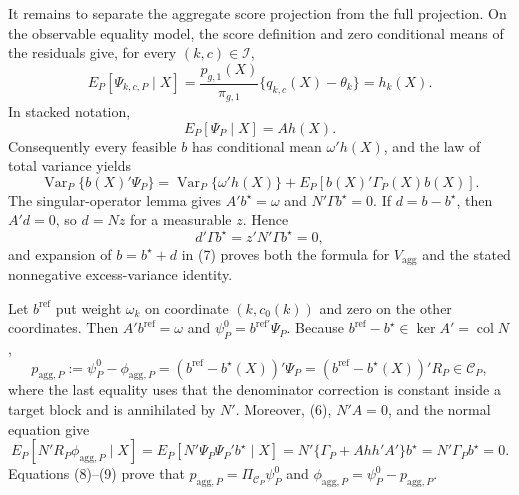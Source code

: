 It remains to separate the aggregate score projection from the full projection.  On the observable equality model, the score definition and zero conditional means of the residuals give, for every \((k,c)\in\mathcal I\),
\[
E_P[\Psi_{k,c,P}\mid X]
=\frac{p_{g,1}(X)}{\pi_{g,1}}\{q_{k,c}(X)-\theta_k\}=h_k(X).
\]
In stacked notation,
\[
E_P[\Psi_P\mid X]=Ah(X).
\tag{6}
\]
Consequently every feasible \(b\) has conditional mean \(\omega'h(X)\), and the law of total variance yields
\[
\operatorname{Var}_P\{b(X)'\Psi_P\}
=\operatorname{Var}_P\{\omega'h(X)\}+E_P[b(X)'\Gamma_P(X)b(X)].
\tag{7}
\]
The singular-operator lemma gives \(A'b^\star=\omega\) and \(N'\Gamma b^\star=0\).  If \(d=b-b^\star\), then \(A'd=0\), so \(d=Nz\) for a measurable \(z\).  Hence
\[
d'\Gamma b^\star=z'N'\Gamma b^\star=0,
\]
and expansion of \(b=b^\star+d\) in (7) proves both the formula for \(V_{\mathrm{agg}}\) and the stated nonnegative excess-variance identity.

Let \(b^{\mathrm{ref}}\) put weight \(\omega_k\) on coordinate \((k,c_0(k))\) and zero on the other coordinates.  Then \(A'b^{\mathrm{ref}}=\omega\) and \(\psi_P^0=b^{\mathrm{ref}\prime}\Psi_P\).  Because \(b^{\mathrm{ref}}-b^\star\in\ker A'=\operatorname{col}N\),
\[
p_{\mathrm{agg},P}:=\psi_P^0-\phi_{\mathrm{agg},P}
=(b^{\mathrm{ref}}-b^\star(X))'\Psi_P
=(b^{\mathrm{ref}}-b^\star(X))'R_P\in\mathcal C_P,
\tag{8}
\]
where the last equality uses that the denominator correction is constant inside a target block and is annihilated by \(N'\).  Moreover, (6), \(N'A=0\), and the normal equation give
\[
E_P[N'R_P\phi_{\mathrm{agg},P}\mid X]
=E_P[N'\Psi_P\Psi_P'b^\star\mid X]
=N'\{\Gamma_P+Ahh'A'\}b^\star
=N'\Gamma_Pb^\star=0.
\tag{9}
\]
Equations (8)--(9) prove that \(p_{\mathrm{agg},P}=\Pi_{\mathcal C_P}\psi_P^0\) and \(\phi_{\mathrm{agg},P}=\psi_P^0-p_{\mathrm{agg},P}\).

